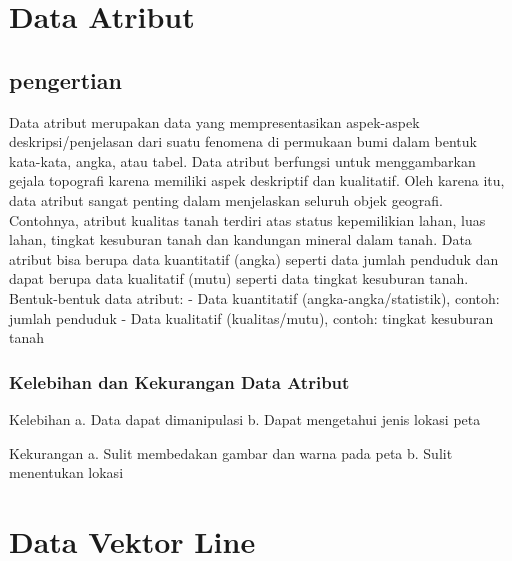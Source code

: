 \section{Data Atribut}
\subsection{pengertian}
Data atribut merupakan data yang mempresentasikan aspek-aspek deskripsi/penjelasan 
dari suatu fenomena di permukaan bumi dalam bentuk kata-kata, angka, atau tabel. 
Data atribut berfungsi untuk menggambarkan gejala topografi karena memiliki aspek deskriptif dan kualitatif. 
Oleh karena itu, data atribut sangat penting dalam menjelaskan seluruh objek geografi. 
Contohnya, atribut kualitas tanah terdiri atas status kepemilikian lahan, luas lahan, 
tingkat kesuburan tanah dan kandungan mineral dalam tanah. 
Data atribut bisa berupa data kuantitatif (angka) seperti data jumlah penduduk dan dapat berupa data kualitatif (mutu) 
seperti data tingkat kesuburan tanah.  
Bentuk-bentuk data atribut:
-	Data kuantitatif (angka-angka/statistik), contoh: jumlah penduduk
-	Data kualitatif (kualitas/mutu), contoh: tingkat kesuburan tanah

\subsubsection{Kelebihan dan Kekurangan Data Atribut}
Kelebihan
a. Data dapat dimanipulasi 
b. Dapat mengetahui jenis lokasi peta

Kekurangan
a. Sulit membedakan gambar dan warna pada peta
b. Sulit menentukan lokasi

\section{Data Vektor Line}

